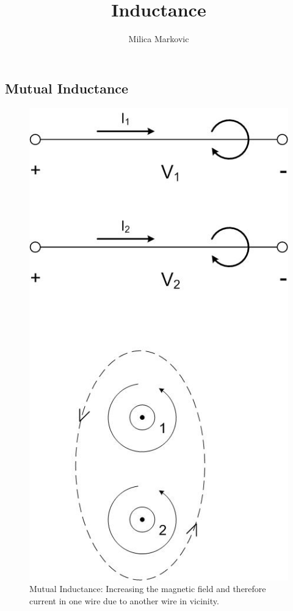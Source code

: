 \documentclass{ximera}
\title{Inductance}
\author{Milica Markovic}
\begin{document}
  
\begin{abstract}  

\end{abstract}  
\maketitle    

\subsection{Mutual Inductance}


\begin{figure}[htbp]
\begin{center}
\includegraphics[scale=0.5]{../jpg/increaseinflux.jpg}
\end{center}
\caption{Mutual Inductance: Increasing the magnetic field and therefore current in one wire due to another wire in vicinity. }
\label{MutualInduc}
\end{figure}
\end{document}
